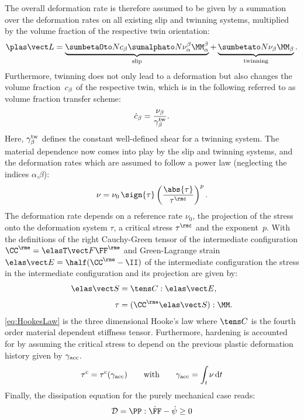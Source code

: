 The overall deformation rate is therefore assumed to be given by a summation over the deformation rates on all existing slip and twinning systems, multiplied by the volume fraction of the respective twin orientation\supercite{kalidindi1998incorporation}:  
\begin{equation}
  \LLp = \underbrace{\sumbO \cb \sumaI \nuab \MMab}_{\text{slip}} + \underbrace{\sumbI \nub \MMb}_{\text{twinning}}.
\end{equation}
Furthermore, twinning does not only lead to a deformation but also changes the volume fraction~$c_{\beta}$ of the respective twin, which is in the following referred to as volume fraction transfer scheme:
\begin{align}
  \dot{c}_{\beta} = \frac{\nu_\beta}{\gamma^{\rm tw}_\beta}.
\end{align}
Here, $\gamma^{\rm tw}_\beta$ defines the constant well-defined shear for a twinning system. The material dependence now comes into play by the slip and twinning systems, and the deformation rates which are assumed to follow a power law (neglecting the indices $\alpha$,$\beta$):
\begin{align}
  \nu = \nu_0 \, \sign{\tau} \left( \frac{\abs{\tau}}{\tau^\rmc} \right)^{p}.
  \label{eq:powerlaw}
\end{align}
The deformation rate depends on a reference rate $\nu_0$, the projection of the stress onto the deformation system $\tau$, a critical stress $\tau^\rmc$ and the exponent~$p$. With the definitions of the right Cauchy-Green tensor of the intermediate configuration $\CCe=\FFeT\FFe$ and Green-Lagrange strain $\EEe=\half(\CCe-\II)$ of the intermediate configuration the stress in the intermediate configuration and its projection are given by:
\begin{align}
  \SSe &= \CCCC:\EEe,  \label{eq:HookesLaw} \\[3pt]
  \tau &= (\CCe\SSe):\MM.
\end{align}
\cref{eq:HookesLaw} is the three dimensional Hooke's law where $\CCCC$ is the fourth order material dependent stiffness tensor. Furthermore, hardening is accounted for by assuming the critical stress to depend on the previous plastic deformation history given by $\gamma_{\rm acc}$.
\begin{align}
  \tau^{\rm c} = \tau^{\rm c}(\gamma_{\rm acc}) \qquad \text{with} \qquad \gamma_{\rm acc} = \int_t \nu \, {\rm d} t
\end{align}
Finally, the dissipation equation for the purely mechanical case reads:
\begin{align} 
  \mathcal{D} = \PP:\dot\FF - \dot\psi \geq 0
\end{align}

